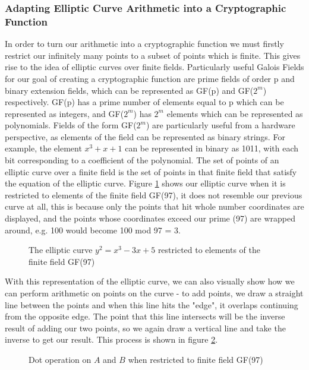 \subsubsection{Adapting Elliptic Curve Arithmetic into a Cryptographic Function}
In order to turn our arithmetic into a cryptographic function we must firstly restrict our infinitely many points to a subset of points which is finite. This gives rise to the idea of elliptic curves over finite fields. Particularly useful Galois Fields for our goal of creating a cryptographic function are prime fields of order p and binary extension fields, which can be represented as GF(p) and GF($2^m$) respectively. GF(p) has a prime number of elements equal to p which can be represented as integers, and GF($2^m$) has $2^m$ elements which can be represented as polynomials. Fields of the form GF($2^m$) are particularly useful from a hardware perspective, as elements of the field can be represented as binary strings. For example, the element $x^3 + x + 1$ can be represented in binary as 1011, with each bit corresponding to a coefficient of the polynomial. The set of points of an elliptic curve over a finite field is the set of points in that finite field that satisfy the equation of the elliptic curve. Figure \ref{fig:ECCFF} shows our elliptic curve when it is restricted to elements of the finite field GF(97), it does not resemble our previous curve at all, this is because only the points that hit whole number coordinates are displayed, and the points whose coordinates exceed our prime (97) are wrapped around, e.g. 100 would become 100 mod 97 = 3.
\begin{figure}[!htb]
\centering
\resizebox{5cm}{!}{}
\caption{The elliptic curve $y^2=x^3-3x+5$ restricted to elements of the finite field GF(97)}
\label{fig:ECCFF}
\end{figure}
With this representation of the elliptic curve, we can also visually show how we can perform arithmetic on points on the curve - to add points, we draw a straight line between the points and when this line hits the "edge", it overlaps continuing from the opposite edge. The point that this line intersects will be the inverse result of adding our two points, so we again draw a vertical line and take the inverse to get our result. This process is shown in figure \ref{fig:ECCFFdot}.
\begin{figure}[!htb]
\centering
\resizebox{5cm}{!}{}
\caption{Dot operation on $A$ and $B$ when restricted to finite field GF(97)}
\label{fig:ECCFFdot}
\end{figure}

